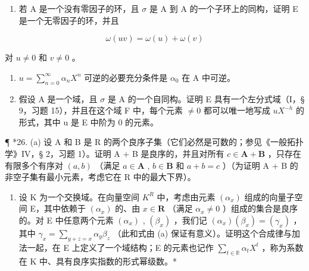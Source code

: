\begin{enumerate}
\def\labelenumi{(\alph{enumi})}
\setcounter{enumi}{1}
\tightlist
\item
  若 A 是一个没有零因子的环，且 \(\sigma\) 是 A 到 A 的一个子环上的同构，证明 E 是一个无零因子的环，并且
\end{enumerate}

\[
\omega (u v) = \omega (u) + \omega (v)
\]

对 \(u \neq 0\) 和 \(v \neq 0\) 。

\begin{enumerate}
\def\labelenumi{(\alph{enumi})}
\setcounter{enumi}{2}
\item
  \(u = \sum_{n=0}^{\infty} \alpha_n X^n\) 可逆的必要充分条件是 \(\alpha_0\) 在 A 中可逆。
\item
  假设 A 是一个域，且 \(\sigma\) 是 A 的一个自同构。证明 E 具有一个左分式域（I，§ 9，习题 15），并且在这个域 F 中，每个元素 \(\neq0\) 都可以唯一地写成 \(uX^{-h}\) 的形式，其中 u 是 E 中阶为 0 的元素。
\end{enumerate}

¶ *26. (a) 设 A 和 B 是 R 的两个良序子集（它们必然是可数的；参见《一般拓扑学》IV，§ 2，习题 1）。证明 A + B 是良序的，并且对所有 \(c \in \mathbf{A} + \mathbf{B}\) ，只存在有限多个有序对 \((a, b)\) （满足 \(a \in \mathbf{A}\) , \(b \in \mathbf{B}\) 和 \(a + b = c\) ）（为证明 A + B 的非空子集有最小元素，考虑它在 R 中的最大下界）。

\begin{enumerate}
\def\labelenumi{(\alph{enumi})}
\setcounter{enumi}{1}
\tightlist
\item
  设 K 为一个交换域。在向量空间 \(K^{R}\) 中，考虑由元素 \((\alpha_{x})\) 组成的向量子空间 E，其中依赖于 \((\alpha_{x})\) 的、由 \(x \in \mathbf{R}\) （满足 \(\alpha_{x} \neq 0\) ）组成的集合是良序的。对 E 中任意两个元素 \((\alpha_{x})\) , \((\beta_{x})\) ，我们记 \((\alpha_{x})(\beta_{x}) = (\gamma_{x})\) ，其中 \(\gamma_{x} = \sum_{y+z=x} \alpha_{y} \beta_{z}\) （此和式由 (a) 保证有意义）。证明这个合成律与加法一起，在 E 上定义了一个域结构；E 的元素也记作 \(\sum_{t \in \mathbb{R}} \alpha_{t} X^{t}\) ，称为系数在 K 中、具有良序实指数的形式幂级数。*
\end{enumerate}


